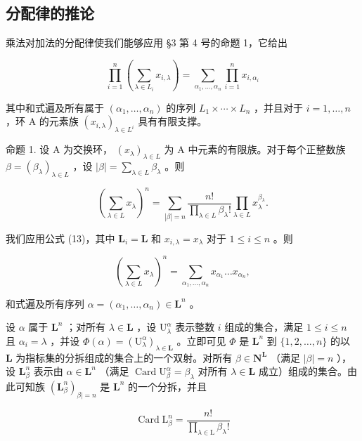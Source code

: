 \subsection{分配律的推论}

乘法对加法的分配律使我们能够应用 §3 第 4 号的命题 1，它给出

\[
\prod_ {i = 1} ^ {n} \left(\sum_ {\lambda \in L _ {i}} x _ {i, \lambda}\right) = \sum_ {\alpha_ {1}, \dots , \alpha_ {n}} \prod_ {i = 1} ^ {n} x _ {i, \alpha_ {i}}\tag{13}
\]

其中和式遍及所有属于 \((\alpha_{1},\ldots,\alpha_{n})\) 的序列 \(L_{1}\times\cdots\times L_{n}\) ，并且对于 \(i=1,\ldots,n\) ，环 A 的元素族 \((x_{i,\lambda})_{\lambda\in L^{i}}\) 具有有限支撑。

命题 1. 设 A 为交换环， \((x_{\lambda})_{\lambda \in L}\) 为 A 中元素的有限族。对于每个正整数族 \(\beta = (\beta_{\lambda})_{\lambda \in L}\) ，设 \(|\beta| = \sum_{\lambda \in L} \beta_{\lambda}\) 。则

\[
\left(\sum_ {\lambda \in L} x _ {\lambda}\right) ^ {n} = \sum_ {| \beta | = n} \frac {n !}{\prod_ {\lambda \in L} \beta_ {\lambda} !} \prod_ {\lambda \in L} x _ {\lambda} ^ {\beta_ {\lambda}}.\tag{14}
\]

我们应用公式 (13)，其中 \(\mathbf{L}_i = \mathbf{L}\) 和 \(x_{i,\lambda} = x_{\lambda}\) 对于 \(1 \leqslant i \leqslant n\) 。则

\[
\left(\sum_ {\lambda \in L} x _ {\lambda}\right) ^ {n} = \sum_ {\alpha_ {1}, \dots , \alpha_ {n}} x _ {\alpha_ {1}} \dots x _ {\alpha_ {n}},\tag{15}
\]

和式遍及所有序列 \(\alpha = (\alpha_{1},\ldots ,\alpha_{n})\in \mathbf{L}^{n}\) 。

设 \(\alpha\) 属于 \(\mathbf{L}^n\) ；对所有 \(\lambda \in \mathbf{L}\) ，设 \(\mathrm{U}_{\lambda}^{\alpha}\) 表示整数 \(i\) 组成的集合，满足 \(1 \leqslant i \leqslant n\) 且 \(\alpha_i = \lambda\) ，并设 \(\Phi(\alpha) = (\mathrm{U}_{\lambda}^{\alpha})_{\lambda \in \mathbf{L}}\) 。立即可见 \(\Phi\) 是 \(\mathbf{L}^n\) 到 \(\{1, 2, \ldots, n\}\) 的以 \(\mathbf{L}\) 为指标集的分拆组成的集合上的一个双射。对所有 \(\beta \in \mathbf{N}^{\mathbf{L}}\) （满足 \(|\beta| = n\) ），设 \(\mathbf{L}_{\beta}^n\) 表示由 \(\alpha \in \mathbf{L}^n\) （满足 \(\operatorname{Card} \mathrm{U}_{\beta}^{\alpha} = \beta_{\lambda}\) 对所有 \(\lambda \in \mathbf{L}\) 成立）组成的集合。由此可知族 \((\mathbf{L}_{\beta}^n)_{\beta | = n}\) 是 \(\mathbf{L}^n\) 的一个分拆，并且

\[
\operatorname{Card} \mathrm{L} _ {\beta} ^ {n} = \frac {n !}{\prod_ {\lambda \in \mathrm{L}} \beta_ {\lambda} !}
\]

